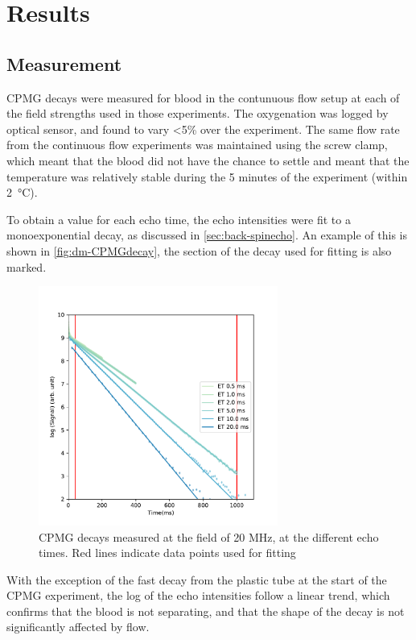 \section{Results}

\subsection{\Ttwo Measurement}
CPMG decays were measured for blood in the contunuous flow setup at each of the field strengths used in those experiments.
The oxygenation was logged by optical sensor, and found to vary <5\% over the experiment.
The same flow rate from the continuous flow experiments was maintained using the screw clamp, which meant that the blood did not have the chance to settle and meant that the temperature was relatively stable during the 5 minutes of the experiment (within \SI{2}{\celsius}).

To obtain a \Ttwo value for each echo time, the echo intensities were fit to a monoexponential decay, as discussed in \autoref{sec:back-spinecho}.
An example of this is shown in \autoref{fig:dm-CPMGdecay}, the section of the decay used for fitting is also marked.

\begin{figure}[ht]
\centering
\includegraphics[width=0.7\textwidth]{figures/diffmodels/20MHzT2fit.pdf}

\caption{CPMG decays measured at the field of 20 MHz, at the different echo times. Red lines indicate data points used for fitting}
\label{fig:dm-CPMGdecay}
\end{figure}

With the exception of the fast decay from the plastic tube at the start of the CPMG experiment, the log of the echo intensities follow a linear trend, which confirms that the blood is not separating, and that the shape of the decay is not significantly affected by flow.

